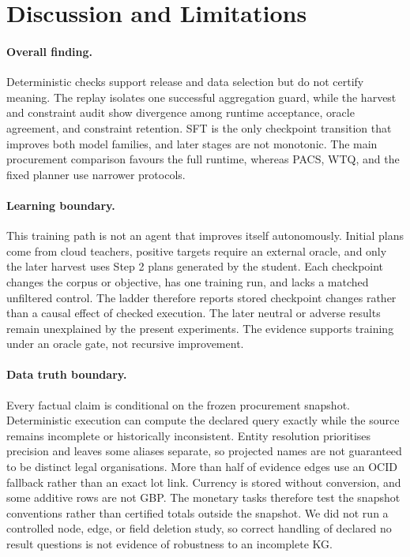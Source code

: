 \section{Discussion and Limitations}
\label{sec:discussion}

\paragraph{Overall finding.}
Deterministic checks support release and data selection but do not certify meaning.  The replay
isolates one successful aggregation guard, while the harvest and constraint audit show divergence
among runtime acceptance, oracle agreement, and constraint retention.  SFT is the only checkpoint
transition that improves both model families, and later stages are not monotonic.  The main
procurement comparison favours the full runtime, whereas PACS, WTQ, and the fixed planner use
narrower protocols.

\paragraph{Learning boundary.}
This training path is not an agent that improves itself autonomously.  Initial plans come from cloud
teachers, positive targets require an external oracle, and only the later harvest uses Step 2 plans
generated by the student.  Each checkpoint changes the corpus or objective, has one training run,
and lacks a matched unfiltered control.  The ladder therefore reports stored checkpoint changes
rather than a causal effect of checked execution.  The later neutral or adverse results remain
unexplained by the present experiments.  The evidence supports training under an oracle gate, not
recursive improvement.

\paragraph{Data truth boundary.}
Every factual claim is conditional on the frozen procurement snapshot.  Deterministic execution
can compute the declared query exactly while the source remains incomplete or historically
inconsistent.  Entity resolution prioritises precision and leaves some aliases separate, so projected names
are not guaranteed to be distinct legal organisations.  More than half of evidence edges use an
OCID fallback rather than an exact lot link.  Currency is stored without conversion, and some
additive rows are not GBP.  The monetary tasks therefore test the snapshot conventions rather than
certified totals outside the snapshot.  We did not run a controlled node, edge, or field deletion study, so
correct handling of declared no result questions is not evidence of robustness to an incomplete KG.

